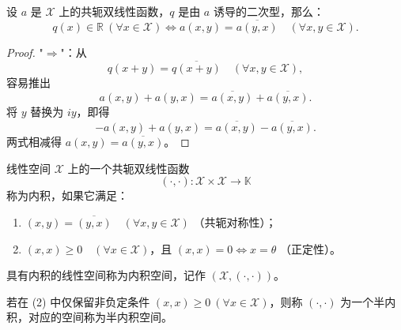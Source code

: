 \documentclass[lang=cn,newtx,10pt,scheme=chinese,thmcnt=chapter]{elegantbook}
\begin{document}
\begin{proposition}
设 $a$ 是 $\mathscr{X}$ 上的共轭双线性函数，$q$ 是由 $a$ 诱导的二次型，那么：
\[
q(x) \in \mathbb{R} \ (\forall x \in \mathscr{X}) \Longleftrightarrow a(x, y) = \overline{a(y, x)} \quad (\forall x, y \in \mathscr{X}).
\]
\end{proposition}
\begin{proof}
"$\Longrightarrow$"：从
\[
q(x+y) = \overline{q(x+y)} \quad (\forall x, y \in \mathscr{X}),
\]
容易推出
\[
a(x, y) + a(y, x) = \overline{a(x, y)} + \overline{a(y, x)}.
\]
将 $y$ 替换为 $iy$，即得
\[
-a(x, y) + a(y, x) = \overline{a(x, y)} - \overline{a(y, x)}.
\]
两式相减得 $a(x, y) = \overline{a(y, x)}$。
\end{proof}
\begin{definition}
线性空间 $\mathscr{X}$ 上的一个共轭双线性函数
\[
(\cdot, \cdot): \mathscr{X} \times \mathscr{X} \to \mathbb{K}
\]
称为内积，如果它满足：
\begin{enumerate}
    \item $(x, y) = \overline{(y, x)} \quad (\forall x, y \in \mathscr{X})$ （共轭对称性）；
    \item $(x, x) \geqslant 0 \quad (\forall x \in \mathscr{X})$，且 $(x, x) = 0 \Longleftrightarrow x = \theta$ （正定性）。
\end{enumerate}
具有内积的线性空间称为内积空间，记作 $(\mathscr{X}, (\cdot, \cdot))$。
\end{definition}
\begin{note}
若在 (2) 中仅保留非负定条件 $(x, x) \geqslant 0 \ (\forall x \in \mathscr{X})$，则称 $(\cdot, \cdot)$ 为一个半内积，对应的空间称为半内积空间。
\end{note}
\end{document}
